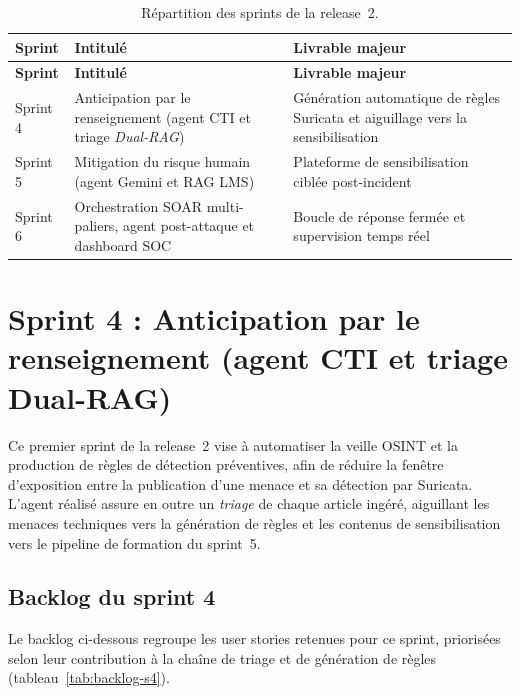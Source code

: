 \renewcommand{\arraystretch}{1.25}
\small
\begin{xltabular}{\textwidth}{|l|>{\raggedright\arraybackslash}X|>{\raggedright\arraybackslash}X|}

\caption{Répartition des sprints de la release~2.}
\label{tab:r2-sprints} \\

\hline
{}
\textbf{Sprint} & \textbf{Intitulé} & \textbf{Livrable majeur} \\ \hline
\endfirsthead

\hline
{}
\textbf{Sprint} & \textbf{Intitulé} & \textbf{Livrable majeur} \\ \hline
\endhead

Sprint 4 & Anticipation par le renseignement (agent \ac{CTI} et triage \emph{Dual-RAG}) & Génération automatique de règles Suricata et aiguillage vers la sensibilisation \\ \hline
Sprint 5 & Mitigation du risque humain (agent Gemini et \ac{RAG} \ac{LMS}) & Plateforme de sensibilisation ciblée post-incident \\ \hline
Sprint 6 & Orchestration \ac{SOAR} multi-paliers, agent post-attaque et dashboard SOC & Boucle de réponse fermée et supervision temps réel \\ \hline

\end{xltabular}

\section{Sprint 4 : Anticipation par le renseignement (agent CTI et triage Dual-RAG)}\label{sec:sprint4}
Ce premier sprint de la release~2 vise à automatiser la veille \ac{OSINT} et la production de règles de détection préventives, afin de réduire la fenêtre d'exposition entre la publication d'une menace et sa détection par Suricata. L'agent réalisé assure en outre un \emph{triage} de chaque article ingéré, aiguillant les menaces techniques vers la génération de règles et les contenus de sensibilisation vers le pipeline de formation du sprint~5.

\subsection{Backlog du sprint 4}
Le backlog ci-dessous regroupe les user stories retenues pour ce sprint, priorisées selon leur contribution à la chaîne de triage et de génération de règles (tableau~\ref{tab:backlog-s4}).

